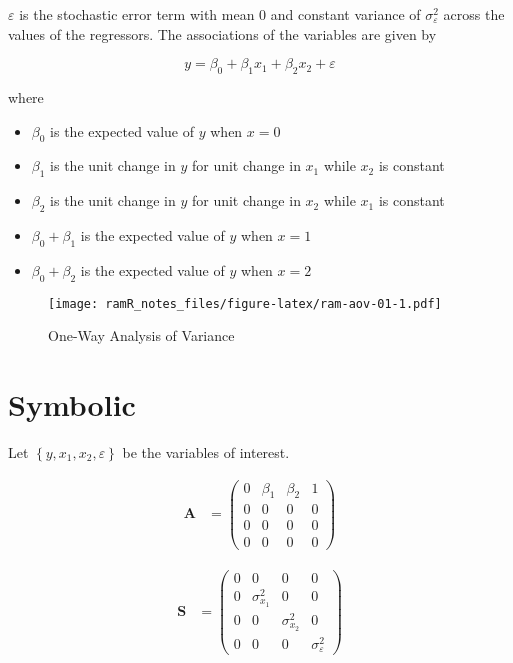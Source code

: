 \documentclass[
]{book}
\providecommand{\tightlist}{%
  \setlength{\itemsep}{0pt}\setlength{\parskip}{0pt}}
\theoremstyle{definition}
\theoremstyle{definition}
\theoremstyle{definition}
\theoremstyle{remark}
\begin{document}
\(\varepsilon\) is the stochastic error term
with mean 0 and constant variance of \(\sigma_{\varepsilon}^{2}\)
across the values of the regressors.
The associations of the variables are given by

\begin{equation*}
  y
  =
  \beta_0 + \beta_1 x_1 + \beta_2 x_2 + \varepsilon
\end{equation*}

\noindent where

\begin{itemize}
\tightlist
\item
  \(\beta_0\) is the expected value of \(y\) when \(x = 0\)
\item
  \(\beta_1\) is the unit change in \(y\) for unit change in \(x_1\) while \(x_2\) is constant
\item
  \(\beta_2\) is the unit change in \(y\) for unit change in \(x_2\) while \(x_1\) is constant
\item
  \(\beta_0 + \beta_1\) is the expected value of \(y\) when \(x = 1\)
\item
  \(\beta_0 + \beta_2\) is the expected value of \(y\) when \(x = 2\)
\end{itemize}

\begin{figure}
\centering
\texttt{[image: ramR\_notes\_files/figure-latex/ram-aov-01-1.pdf]}
\caption{\label{fig:ram-aov-01}One-Way Analysis of Variance}
\end{figure}

\hypertarget{symbolic-1}{%
\section{Symbolic}\label{symbolic-1}}

Let \(\left\{ y, x_1, x_2, \varepsilon \right\}\) be the variables of interest.

\begin{align*}\mathbf{A} &=\left( \begin{array}{cccc} 0 & \beta  _{1} & \beta  _{2} & 1 \\ 0 & 0 & 0 & 0 \\ 0 & 0 & 0 & 0 \\ 0 & 0 & 0 & 0 \end{array} \right)\end{align*}

\begin{align*}\mathbf{S} &=\left( \begin{array}{cccc} 0 & 0 & 0 & 0 \\ 0 & \sigma  _{x _{1}} ^{2} & 0 & 0 \\ 0 & 0 & \sigma  _{x _{2}} ^{2} & 0 \\ 0 & 0 & 0 & \sigma  _{\varepsilon } ^{2} \end{array} \right)\end{align*}
\end{document}
